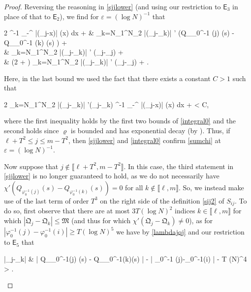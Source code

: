 \documentclass{amsart}
\numberwithin{equation}{section}
\theoremstyle{remark}
\theoremstyle{definition}
\begin{document}
\begin{proof}
			Reversing the reasoning in \eqref{sjjlower} (and using our restriction to $\mathsf{E}_3$ in place of that to $\mathsf{E}_2$), we find for $\varepsilon = (\log N)^{-1}$ that  
			\begin{flalign}
				\label{integral0} 
				\begin{aligned} 
				2 \alpha^{-1} \displaystyle\int_{-\infty}^{\infty} |(\Lambda_j-x)| \varrho (x) dx + \displaystyle{} &  \displaystyle\sum_{k=N_1}^{N_2} |(\Lambda_j-\Lambda_k)| \cdot \chi' (Q_{\varphi_0^{-1} (j)} (s) - Q_{\varphi_0^{-1} (k)} (s) ) + \displaystyle{} \\ 
				&  \displaystyle\sum_{k=N_1}^{N_2} |(\Lambda_j-\Lambda_k)| \cdot \chi' (\mathfrak{Q}_j-_j) + \displaystyle{} \\
				& \ge (2 + \varepsilon) \displaystyle\sum_{k=N_1}^{N_2} |(\Lambda_j-\Lambda_k)| \cdot \chi' (\mathfrak{Q}_j-_j) + \varepsilon.
				\end{aligned}
			\end{flalign}
			
			\noindent Here, in the last bound we used the fact that there exists a constant $C>1$ such that
			\begin{flalign*}
				2 \displaystyle\sum_{k=N_1}^{N_2} |(\Lambda_j-\Lambda_k)| \cdot \chi'(\mathfrak{Q}_j-_k)  \alpha^{-1} \displaystyle\int_{-\infty}^{\infty} |(\Lambda_j-x)| \varrho(x) dx + \displaystyle{} < C,
			\end{flalign*}
			
			\noindent where the first inequality holds by the first two bounds of \eqref{integral0} and the second holds since $\varrho$ is bounded and has exponential decay (by ). Thus, if $\ell + T^2 \le j \le m - T^2$, then \eqref{sjjlower} and \eqref{integral0} confirm \eqref{sumchi} at $\varepsilon = (\log N)^{-1}$.
			
			 Now suppose that $j \notin \llbracket \ell+T^2,m-T^2 \rrbracket$. In this case, the third statement in \eqref{sjjlower} is no longer guaranteed to hold, as we do not necessarily have $\chi' (Q_{\varphi_0^{-1} (j)} (s) - Q_{\varphi_0^{-1} (k)} (s)) = 0$ for all $k \notin \llbracket \ell, m \rrbracket$. So, we instead make use of the last term of order $T^3$ on the right side of the definition \eqref{sij2} of $S_{ij}$.  To do so, first observe that there are at most $3T (\log N)^2$ indices $k \in \llbracket \ell, m \rrbracket$ for which $|\mathfrak{Q}_j - \mathfrak{Q}_k| \le \mathfrak{M}$ (and thus for which $\chi' (\mathfrak{Q}_j - \mathfrak{Q}_k) \ne 0$), as for $|\varphi_0^{-1}(j)-\varphi_0^{-1}(i)| \ge T (\log N)^5$ we have by \eqref{lambdajqj} and our restriction to $\mathsf{E}_5$ that 
			 \begin{flalign*}
			 	|\mathfrak{Q}_j-_k| & \ge | Q_{\varphi_0^{-1}(j)} (s) - Q_{\varphi_0^{-1}(k)}(s) | -   \ge \displaystyle{} \cdot| \varphi_0^{-1} (j)-\varphi_0^{-1}(i) |  -  \ge \displaystyle{} \cdot T (\log N)^4 > \mathfrak{M}.
			 \end{flalign*}
			 

\end{proof}
\end{document}

